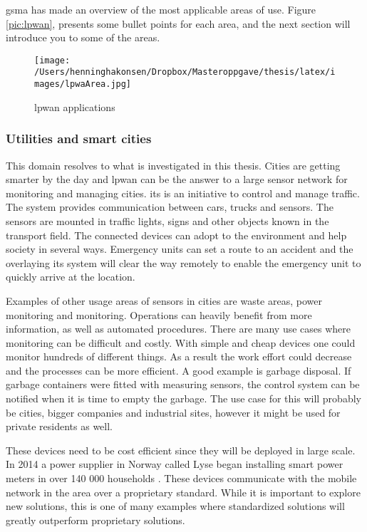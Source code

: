 \documentclass[USenglish]{ifimaster}  %
\begin{document}
\acrfull{gsma} has made an overview of the most applicable areas of use. Figure \vref{pic:lpwan}, presents some bullet points for each area, and the next section will introduce you to some of the areas.

\begin{figure}[ht]
  \centering\texttt{[image: /Users/henninghakonsen/Dropbox/Masteroppgave/thesis/latex/images/lpwaArea.jpg]}
  \caption[\acrshort{lpwan} applications]{\acrshort{lpwan} applications \cite{online:lpwaFuture}}
  \label{pic:lpwan}
\end{figure}

\subsubsection{Utilities and smart cities}
This domain resolves to what is investigated in this thesis. Cities are getting smarter by the day and \acrshort{lpwan} can be the answer to a large sensor network for monitoring and managing cities. \acrfull{its} is an initiative to control and manage traffic. The system provides communication between cars, trucks and sensors. The sensors are mounted in traffic lights, signs and other objects known in the transport field. The connected devices can adopt to the environment and help society in several ways. Emergency units can set a route to an accident and the overlaying \acrshort{its} system will clear the way remotely to enable the emergency unit to quickly arrive at the location.

Examples of other usage areas of sensors in cities are waste areas, power monitoring and  monitoring. Operations can heavily benefit from more information, as well as automated procedures. There are many use cases where monitoring can be difficult and costly. With simple and cheap devices one could monitor hundreds of different things. As a result the work effort could decrease and the processes can be more efficient. A good example is garbage disposal. If garbage containers were fitted with measuring sensors, the control system can be notified when it is time to empty the garbage. The use case for this will probably be cities, bigger companies and industrial sites, however it might be used for private residents as well.

These devices need to be cost efficient since they will be deployed in large scale. In 2014 a power supplier in Norway called Lyse began installing smart power meters in over 140 000 households \cite{online:lyseAMS}. These devices communicate with the mobile network in the area over a proprietary standard. While it is important to explore new solutions, this is one of many examples where standardized solutions will greatly outperform proprietary solutions.
\end{document}
